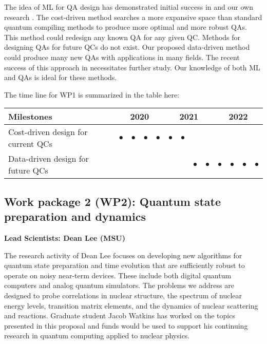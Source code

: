 \documentclass[10pt]{article}
\begin{document}
The idea of ML for QA design has demonstrated initial success in \cite{Mitarai2018,Cincio2018} and our own research \cite{Khatri2018}. The cost-driven method searches a more expansive space than standard quantum compiling methods to produce more optimal and more robust QAs. This method could redesign any known QA for any given QC.
Methods for designing QAs for future QCs do not exist. Our proposed data-driven method could produce many new QAs with applications in many fields. The recent success of this approach in \cite{Cincio2018} necessitates further study. Our knowledge of both ML and QAs is ideal for these methods.


The time line for WP1 is summarized in the table here:
\begin{footnotesize}
\begin{center}
\begin{tabular}{|l|c|c|c|c|c|c|c|c|c|c|c|c|}
\hline
\multicolumn{1}{|l}{Milestones } & \multicolumn{4}{|c|}{ 2020 } & \multicolumn{4}{c|}{ 2021 } & \multicolumn{4}{c|}{ 2022 } \\
\hline
Cost-driven design for current QCs &$\bullet$ &$\bullet$ &$\bullet$ &$\bullet$ & $\bullet$ & $\bullet$& & & & & & \\
\hline
Data-driven design for future QCs & & & & & & & $\bullet$ & $\bullet$ & $\bullet$ &$\bullet$ &$\bullet$ &$\bullet$ \\
\hline
\end{tabular}
\end{center}
\end{footnotesize}



\subsection{Work package 2 (WP2): Quantum state preparation and dynamics}
{\bf Lead Scientists: Dean Lee (MSU)}

The research activity of Dean Lee focuses on developing new algorithms for quantum state preparation and time evolution that are sufficiently robust to operate on noisy near-term devices.  These include both digital quantum computers and analog quantum simulators.  The problems we address are designed to probe correlations in nuclear structure, the spectrum of nuclear energy levels, transition matrix elements, and the dynamics of nuclear scattering and reactions.  Graduate  student Jacob Watkins has worked on the topics presented in this proposal and funds would be used to support his continuing research in quantum computing applied to nuclear physics. 
\end{document}
